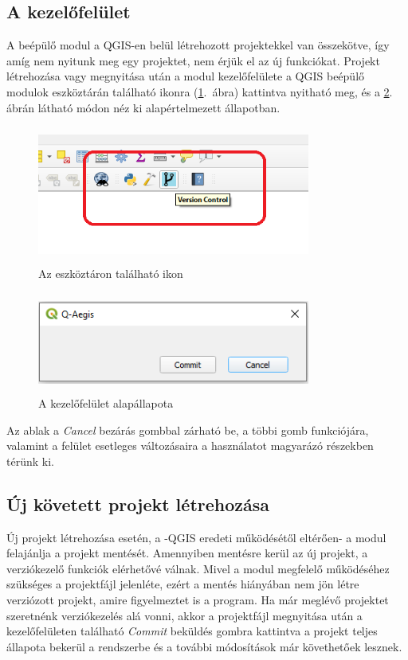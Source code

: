 \subsection{A kezelőfelület}
A beépülő modul a QGIS-en belül létrehozott projektekkel van összekötve, így amíg nem nyitunk meg egy projektet, nem érjük el az új funkciókat. Projekt létrehozása vagy megnyitása után a modul kezelőfelülete a QGIS beépülő modulok eszköztárán található ikonra (\ref{fig:picture-2}.~ábra) kattintva nyitható meg, és a \ref{fig:picture-3}. ábrán látható módon néz ki alapértelmezett állapotban.
\begin{figure}[H]
	\centering
	\includegraphics[width=0.8\textwidth,height=170px]{images/plugin_button_new.png}
	\caption{Az eszköztáron található ikon}
	\label{fig:picture-2}
\end{figure}
\begin{figure}[H]
	\centering
	\includegraphics[width=0.8\textwidth,height=125px]{images/norepo_state_new.png}
	\caption{A kezelőfelület alapállapota}
	\label{fig:picture-3}
\end{figure}
Az ablak a \emph{Cancel} bezárás gombbal zárható be, a többi gomb funkciójára, valamint a felület esetleges változásaira a használatot magyarázó részekben térünk ki.
\subsection{Új követett projekt létrehozása}
Új projekt létrehozása esetén, a -QGIS eredeti működésétől eltérően- a modul felajánlja a projekt mentését. Amennyiben mentésre kerül az új projekt, a verziókezelő funkciók elérhetővé válnak. Mivel a modul megfelelő működéséhez szükséges a projektfájl jelenléte, ezért a mentés hiányában nem jön létre verziózott projekt, amire figyelmeztet is a program.
Ha már meglévő projektet szeretnénk verziókezelés alá vonni, akkor a projektfájl megnyitása után a kezelőfelületen található \emph{Commit} beküldés gombra kattintva a projekt teljes állapota bekerül a rendszerbe és a további módosítások már követhetőek lesznek.

